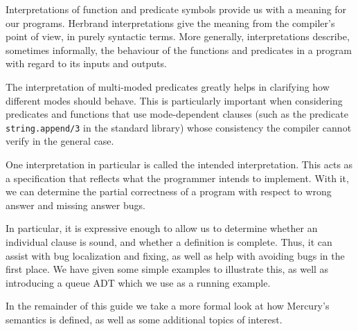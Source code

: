 Interpretations of function and predicate symbols
provide us with a meaning for our programs.
Herbrand interpretations give the meaning
from the compiler's point of view,
in purely syntactic terms.
More generally, interpretations describe,
sometimes informally,
the behaviour of the functions and predicates in a program
with regard to its inputs and outputs.

The interpretation of multi-moded predicates
greatly helps in clarifying how different modes should behave.
This is particularly important when considering
predicates and functions that use mode-dependent clauses
(such as the predicate \texttt{string.append/3} in the standard library)
whose consistency the compiler cannot verify in the general case.

One interpretation in particular
is called the intended interpretation.
This acts as a specification
that reflects what the programmer intends to implement.
With it, we can determine the partial correctness of a program
with respect to wrong answer and missing answer bugs.

In particular,
it is expressive enough to allow us to determine
whether an individual clause is sound,
and whether a definition is complete.
Thus, it can assist with bug localization and fixing,
as well as help with avoiding bugs in the first place.
We have given some simple examples to illustrate this,
as well as introducing a queue ADT
which we use as a running example.

In the remainder of this guide
we take a more formal look at
how Mercury's semantics is defined,
as well as some additional topics of interest.
